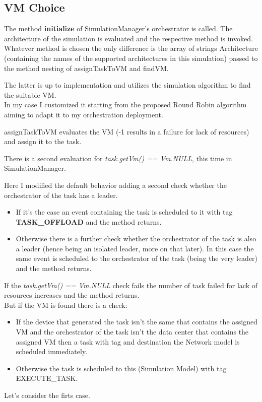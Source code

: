 \documentclass[12pt]{report}
\begin{document}
\subsection*{VM Choice}
The method \textbf{initialize} of SimulationManager's orchestrator is called. The architecture of the simulation is evaluated and the respective method is invoked. Whatever method is chosen the only difference is the array of strings Architecture (containing the names of the supported architectures in this simulation) passed to the method nesting of assignTaskToVM and findVM.

The latter is up to implementation and utilizes the simulation algorithm to find the suitable VM.\\
In my case I customized it starting from the proposed Round Robin algorithm aiming to adapt it to my  orchestration deployment.

assignTaskToVM evaluates the VM (-1 results in a failure for lack of resources) and assign it to the task. 

\vspace{0.5cm}
There is a second evaluation for \textit{task.getVm() == Vm.NULL}, this time in SimulationManager.

Here I modified the default behavior adding a second check whether the orchestrator of the task has a leader.
\begin{itemize}
	\item If it's the case an event containing the task is scheduled to it with tag \textbf{TASK\_OFFLOAD} and the method returns.
	\item Otherwise there is a further check whether the orchestrator of the task is also a leader (hence being an isolated leader, more on that later). %
	In this case the same event is scheduled to the orchestrator of the task (being the very leader) and the method returns.
\end{itemize}
If the \textit{task.getVm() == Vm.NULL} check fails the number of task failed for lack of resources increases and the method returns.\\
But if the VM is found there is a check:
\begin{itemize}
	\item If the device that generated the task isn't the same that contains the assigned VM and the orchestrator of the task isn't the data center that contains the assigned VM then a task with tag  and destination the Network model is scheduled immediately.
	\item Otherwise the task is scheduled to this (Simulation Model) with tag EXECUTE\_TASK.
\end{itemize}
Let's consider the firts case.
\end{document}
